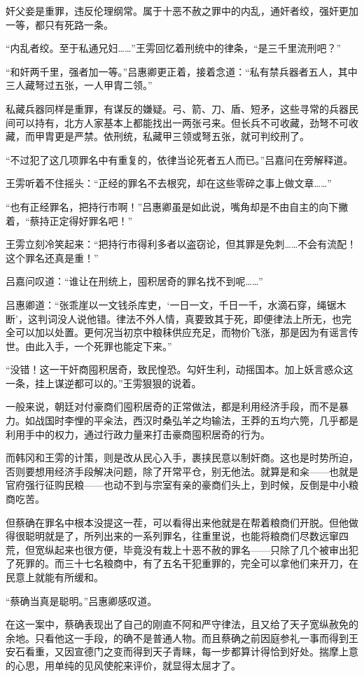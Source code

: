 奸父妾是重罪，违反伦理纲常。属于十恶不赦之罪中的内乱，通奸者绞，强奸更加一等，都只有死路一条。

“内乱者绞。至于私通兄妇……”王雱回忆着刑统中的律条，“是三千里流刑吧？”

“和奸两千里，强者加一等。”吕惠卿更正着，接着念道：“私有禁兵器者五人，其中三人藏弩过五张，一人甲胄二领。”

私藏兵器同样是重罪，有谋反的嫌疑。弓、箭、刀、盾、短矛，这些寻常的兵器民间可以持有，北方人家基本上都能找出一两张弓来。但长兵不可收藏，劲弩不可收藏，而甲胄更是严禁。依刑统，私藏甲三领或弩五张，就可判绞刑了。

“不过犯了这几项罪名中有重复的，依律当论死者五人而已。”吕嘉问在旁解释道。

王雱听着不住摇头：“正经的罪名不去根究，却在这些零碎之事上做文章……”

“也有正经罪名，把持行市啊！”吕惠卿虽是如此说，嘴角却是不由自主的向下撇着，“蔡持正定得好罪名吧！”

王雱立刻冷笑起来：“把持行市得利多者以盗窃论，但其罪是免刺……不会有流配！这个罪名还真是重！”

吕嘉问叹道：“谁让在刑统上，囤积居奇的罪名找不到呢……”

吕惠卿道：“张乖崖以一文钱杀库吏，‘一日一文，千日一千，水滴石穿，绳锯木断’，这判词没人说他错。律法不外人情，真要致其于死，即便律法上所无，也完全可以加以处置。更何况当初京中粮秣供应充足，而物价飞涨，那是因为有谣言传世。由此入手，一个死罪也能定下来。”

“没错！这一干奸商囤积居奇，致民惶恐。勾奸生利，动摇国本。加上妖言惑众这一条，挂上谋逆都可以的。”王雱狠狠的说着。

一般来说，朝廷对付豪商们囤积居奇的正常做法，都是利用经济手段，而不是暴力。如战国时李悝的平籴法，西汉时桑弘羊之均输法，王莽的五均六筦，几乎都是利用手中的权力，通过行政力量来打击豪商囤积居奇的行为。

而韩冈和王雱的计策，则是改从民心入手，裹挟民意以制奸商。这也是时势所迫，否则要想用经济手段解决问题，除了开常平仓，别无他法。就算是和籴——也就是官府强行征购民粮——也动不到与宗室有亲的豪商们头上，到时候，反倒是中小粮商吃苦。

但蔡确在罪名中根本没提这一茬，可以看得出来他就是在帮着粮商们开脱。但他做得很聪明就是了，所列出来的一系列罪名，往重里说，也能将粮商们尽数远窜四荒，但宽纵起来也很方便，毕竟没有栽上十恶不赦的罪名——只除了几个被审出犯了死罪的。而三十七名粮商中，有了五名干犯重罪的，完全可以拿他们来开刀，在民意上就能有所缓和。

“蔡确当真是聪明。”吕惠卿感叹道。

在这一案中，蔡确表现出了自己的刚直不阿和严守律法，且又给了天子宽纵赦免的余地。只看他这一手段，的确不是普通人物。而且蔡确之前因庭参礼一事而得到王安石看重，又因宣德门之变而得到天子青睐，每一步都算计得恰到好处。揣摩上意的心思，用单纯的见风使舵来评价，就显得太屈才了。

